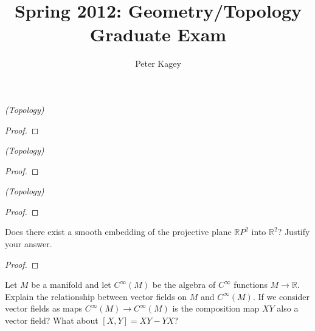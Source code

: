 \documentclass{article}
\newenvironment{problem}[2][Problem]{\begin{trivlist}
\item[\hskip \labelsep {\bfseries #1}\hskip \labelsep {\bfseries #2.}]}{\end{trivlist}}
\begin{document}
\title{Spring 2012: Geometry/Topology Graduate Exam}
\author{Peter Kagey}

\maketitle

\begin{problem}{1} \textit{(Topology)}
\end{problem}

\begin{proof}
\end{proof}

\pagebreak

\begin{problem}{2} \textit{(Topology)}
\end{problem}

\begin{proof}
\end{proof}

\pagebreak

\begin{problem}{3} \textit{(Topology)}
\end{problem}

\begin{proof}
\end{proof}

\pagebreak

\begin{problem}{4}
  Does there exist a smooth embedding of the projective plane $\mathbb{R}P^2$
  into $\mathbb{R}^2$? Justify your answer.
\end{problem}

\begin{proof}
\end{proof}

\pagebreak

\begin{problem}{5}
  Let $M$ be a manifold and let $C^\infty(M)$ be the algebra of $C^\infty$
  functions $M \rightarrow \mathbb{R}$. Explain the relationship between vector
  fields on $M$ and $C^\infty(M)$.
  If we consider vector fields as maps
  $C^\infty(M) \rightarrow C^\infty(M)$ is the composition map $XY$ also a
  vector field? What about $[X, Y] = XY - YX$?
\end{problem}
\end{document}
